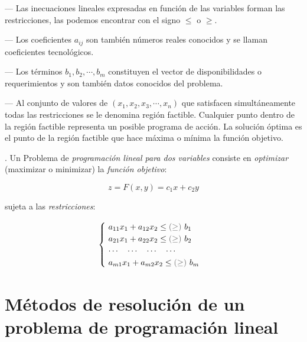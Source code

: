 \begin{definition}
\begin{adjustwidth}{20pt}{10pt}
--- Las inecuaciones lineales expresadas en función de las variables forman las restricciones, las podemos encontrar con el signo $\le$ o $\ge$.

--- Los coeficientes $a_{ij}$ son también números reales conocidos y se llaman coeficientes tecnológicos.

--- Los términos $b_1, b_2, \cdots , b_m$  constituyen el vector de disponibilidades o requerimientos y son también datos conocidos del problema.

--- Al conjunto de valores de $(x_1, x_2, x_3, \cdots , x_n)$ que satisfacen simultáneamente todas las restricciones se le denomina región factible. Cualquier punto dentro de la región factible representa un posible programa de acción. La solución óptima es el punto de la región factible que hace máxima o mínima la función objetivo.
\end{adjustwidth}

\end{definition}

\vspace{5mm}

\begin{definition}
.
Un Problema de \emph{programación lineal para dos variables} consiste en \emph{optimizar} (maximizar o minimizar) la \emph{función objetivo}:

$$z = F (x, y) = c_1x + c_2y$$ 

sujeta a las \emph{restricciones}:	

$$\begin{cases}
	\ a_{11} x_1+a_{12} x_2 \le \textcolor{gris}{(\ge)} \ b_1  \\
	\ a_{21} x_1+a_{22} x_2 \le \textcolor{gris}{(\ge)} \ b_2  \\
	\ \cdots \quad  \cdots \quad \cdots \quad \cdots \quad \\
	\ a_{m1} x_1+a_{m2} x_2 \le \textcolor{gris}{(\ge)} \ b_m  \\
\end{cases}$$

\end{definition}

\section[Métodos de resolución de un problema de programación lineal]{Métodos de resolución de un problema de programación lineal} 
	\vspace{10mm}

